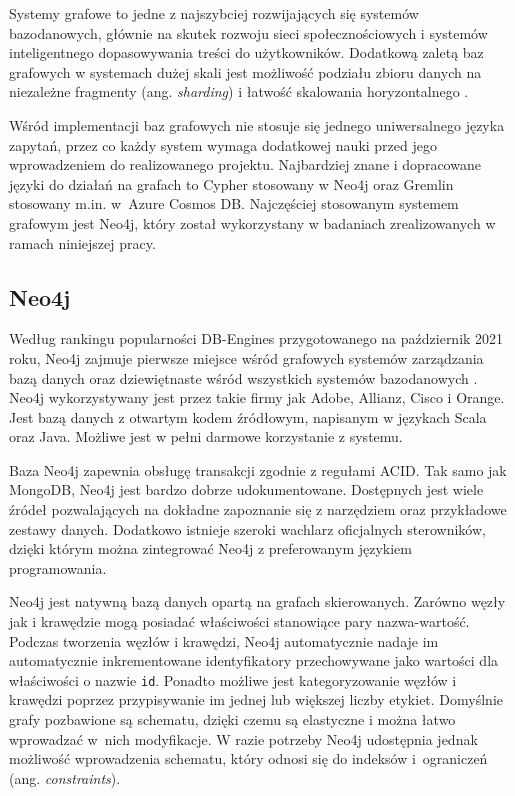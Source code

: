 \documentclass[a4paper,twoside,12pt]{book}
\newcommand{\obcy}[1]{\emph{#1}}
\newcommand{\ang}[1]{{\selectlanguage{british}\obcy{#1}}}
\begin{document}
Systemy grafowe to jedne z najszybciej rozwijających się systemów bazodanowych, głównie na skutek rozwoju sieci społecznościowych i systemów inteligentnego dopasowywania treści do użytkowników. Dodatkową zaletą baz grafowych w systemach dużej skali jest możliwość podziału zbioru danych na niezależne fragmenty (ang. \ang{sharding}) i łatwość skalowania horyzontalnego  \cite{bib:graph-databases-comparison}.

Wśród implementacji baz grafowych nie stosuje się  jednego uniwersalnego języka zapytań, przez co każdy system wymaga dodatkowej nauki przed jego wprowadzeniem do realizowanego projektu. Najbardziej znane i dopracowane języki do działań na grafach to Cypher stosowany w Neo4j oraz Gremlin stosowany m.in. w~Azure Cosmos DB. Najczęściej stosowanym systemem grafowym jest Neo4j, który został wykorzystany w badaniach zrealizowanych w ramach niniejszej pracy.

\subsection{Neo4j}

Według rankingu popularności DB-Engines przygotowanego na październik 2021 roku, Neo4j zajmuje pierwsze miejsce wśród grafowych systemów zarządzania bazą danych oraz dziewiętnaste wśród wszystkich systemów bazodanowych \cite{bib:db-engines-ranking}. Neo4j wykorzystywany jest przez takie firmy jak Adobe, Allianz, Cisco i Orange. Jest bazą danych z otwartym kodem źródłowym, napisanym w językach Scala oraz Java. Możliwe jest w pełni darmowe korzystanie z systemu. 

Baza Neo4j zapewnia obsługę transakcji zgodnie z regułami ACID. Tak samo jak MongoDB, Neo4j jest bardzo dobrze udokumentowane. Dostępnych jest wiele źródeł pozwalających na dokładne zapoznanie się z narzędziem oraz przykładowe zestawy danych. Dodatkowo istnieje szeroki wachlarz oficjalnych sterowników, dzięki którym można zintegrować Neo4j z preferowanym językiem programowania.  

Neo4j jest natywną bazą danych opartą na grafach skierowanych. Zarówno węzły jak i krawędzie mogą posiadać właściwości stanowiące pary nazwa-wartość. Podczas tworzenia węzłów i krawędzi, Neo4j automatycznie nadaje im automatycznie inkrementowane identyfikatory przechowywane jako wartości dla właściwości o nazwie \texttt{id}. Ponadto możliwe jest kategoryzowanie węzłów i krawędzi poprzez przypisywanie im jednej lub większej liczby etykiet. Domyślnie grafy pozbawione są schematu, dzięki czemu są elastyczne i można łatwo wprowadzać w~nich modyfikacje. W razie potrzeby Neo4j udostępnia jednak możliwość wprowadzenia schematu, który odnosi się do indeksów i~ograniczeń (ang. \ang{constraints}).
\end{document}
